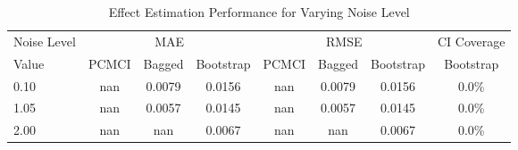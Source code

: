 \begin{table}[htbp]
\centering
\caption{Effect Estimation Performance for Varying Noise Level}
\label{tab:noise_performance}
\begin{tabular}{l|ccc|ccc|c}
\hline
Noise Level & \multicolumn{3}{c|}{MAE} & \multicolumn{3}{c|}{RMSE} & CI Coverage \\
 Value & PCMCI & Bagged & Bootstrap & PCMCI & Bagged & Bootstrap & Bootstrap \\
\hline
0.10 & nan & 0.0079 & 0.0156 & nan & 0.0079 & 0.0156 & 0.0\% \\
1.05 & nan & 0.0057 & 0.0145 & nan & 0.0057 & 0.0145 & 0.0\% \\
2.00 & nan & nan & 0.0067 & nan & nan & 0.0067 & 0.0\% \\
\hline
\end{tabular}
\end{table}
